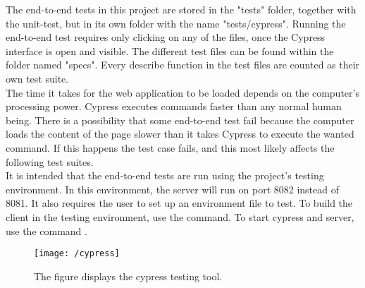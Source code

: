 The end-to-end tests in this project are stored in the "tests" folder, together with the unit-test, but in its own folder with the name "tests/cypress". Running the end-to-end test requires only clicking on any of the files, once the Cypress interface is open and visible. The different test files can be found within the folder named "specs". Every describe function in the test files are counted as their own test suite. 
\\[11pt]
The time it takes for the web application to be loaded depends on the computer's processing power. Cypress executes commands faster than any normal human being. There is a possibility that some end-to-end test fail because the computer loads the content of the page slower than it takes Cypress to execute the wanted command. If this happens the test case fails, and this most likely affects the following test suites. 
\\[11pt]
It is intended that the end-to-end tests are run using the project's testing environment. In this environment, the server will run on port 8082 instead of 8081. It also requires the user to set up an environment file to test. To build the client in the testing environment, use the  command. To start cypress and server, use the command .

\begin{figure}[H]
	\centering
	\texttt{[image: /cypress]}
	\caption{The figure displays the cypress testing tool.}
	\label{fig:cypress}
\end{figure}